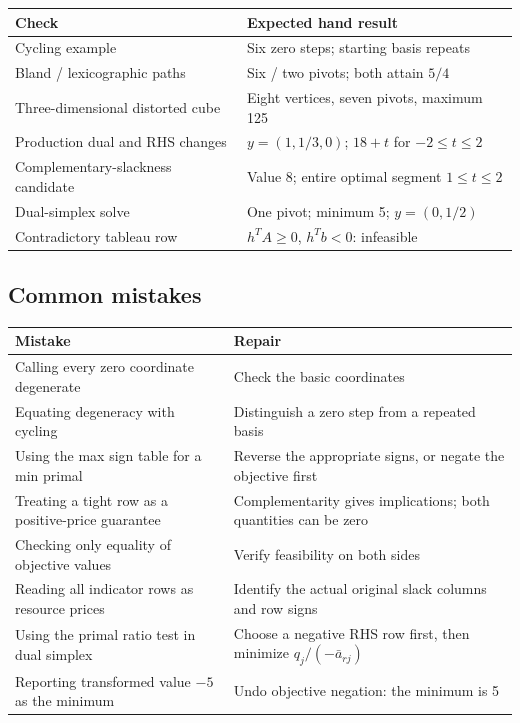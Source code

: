 \documentclass[11pt,a4paper]{article}
\begin{document}
\begin{center}
  \begin{tabular}{>{\raggedright\arraybackslash}p{5.6cm}>{\raggedright\arraybackslash}p{9cm}}\toprule
    Check & Expected hand result\\\midrule
    Cycling example & Six zero steps; starting basis repeats\\
    Bland / lexicographic paths & Six / two pivots; both attain $5/4$\\
    Three-dimensional distorted cube & Eight vertices, seven pivots, maximum 125\\
    Production dual and RHS changes & $y=(1,1/3,0)$; $18+t$ for $-2\leq t\leq2$\\
    Complementary-slackness candidate & Value 8; entire optimal segment $1\leq t\leq2$\\
    Dual-simplex solve & One pivot; minimum 5; $y=(0,1/2)$\\
    Contradictory tableau row & $h^TA\geq0$, $h^Tb<0$: infeasible\\\bottomrule
  \end{tabular}
\end{center}
\subsection{Common mistakes}
\begin{center}
  \begin{tabular}{>{\raggedright\arraybackslash}p{6cm}>{\raggedright\arraybackslash}p{8.6cm}}\toprule
    Mistake & Repair\\\midrule
    Calling every zero coordinate degenerate & Check the basic coordinates\\
    Equating degeneracy with cycling & Distinguish a zero step from a repeated basis\\
    Using the max sign table for a min primal & Reverse the appropriate signs, or negate the objective first\\
    Treating a tight row as a positive-price guarantee & Complementarity gives implications; both quantities can be zero\\
    Checking only equality of objective values & Verify feasibility on both sides\\
    Reading all indicator rows as resource prices & Identify the actual original slack columns and row signs\\
    Using the primal ratio test in dual simplex & Choose a negative RHS row first, then minimize $q_j/(-\bar a_{rj})$\\
    Reporting transformed value $-5$ as the minimum & Undo objective negation: the minimum is 5\\\bottomrule
  \end{tabular}
\end{center}
\end{document}
